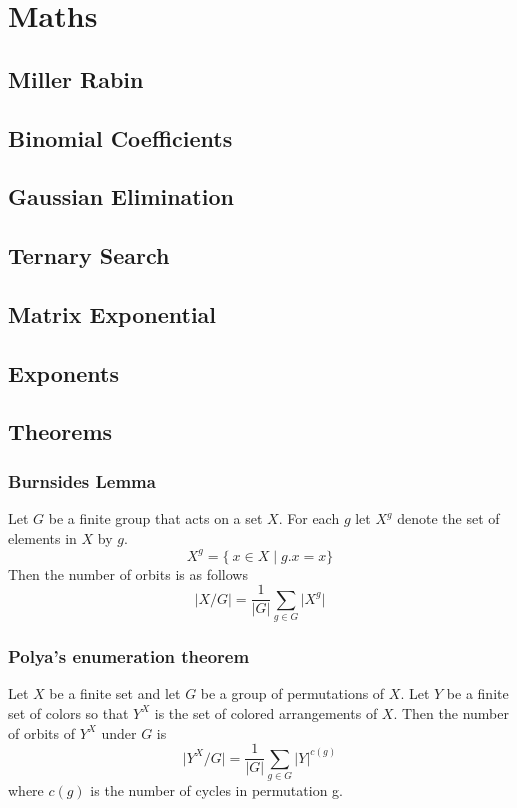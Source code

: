 \documentclass[twocolumn]{article}
\begin{document}
    \newpage
    \section{Maths}
        \subsection{Miller Rabin}
        
        \subsection{Binomial Coefficients}
        
        \subsection{Gaussian Elimination}
        
        \subsection{Ternary Search}
        
        \subsection{Matrix Exponential}
        
        \subsection{Exponents}
        
        \subsection{Theorems}
            \subsubsection{Burnsides Lemma}
            Let $G$ be a finite group that acts on a set $X$. For each $g$ let $X^g$ denote the set of elements in $X$ by $g$.
            \[ X^g = \{\ x \in X \mid g.x = x \} \]
            Then the number of orbits is as follows
            \[ \lvert X/G \rvert  = \frac{1}{\lvert G \rvert} \sum_{g\in G} \lvert X^g \rvert \]
            \subsubsection{Polya's enumeration theorem}
            Let $X$ be a finite set and let $G$ be a group of permutations of $X$. Let $Y$ be a finite set of colors so that $Y^X$ is the set of colored arrangements of $X$. Then the number of orbits of $Y^X$ under $G$ is
            \[\lvert Y^X/G\rvert = \frac{1}{\lvert G \rvert} \sum_{g \in G} \lvert Y \rvert^{c(g)} \]
            where $c(g)$ is the number of cycles in permutation g.
\end{document}
